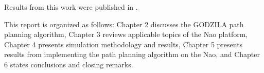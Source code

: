 Results from this work were published in \cite{our_paper1}.

This report is organized as follows: Chapter 2 discusses the GODZILA path planning algorithm, Chapter 3 reviews applicable topics of the Nao platform, Chapter 4 presents simulation methodology and results, Chapter 5 presents results from implementing the path planning algorithm on the Nao, and Chapter 6 states conclusions and closing remarks.



